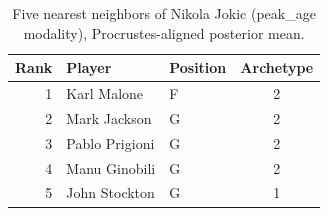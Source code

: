 \begin{table}[htbp]
  \centering\small
  \begin{tabular}{rllc}
    \toprule
    Rank & Player & Position & Archetype \\
    \midrule
    1 & Karl Malone & F & 2 \\
    2 & Mark Jackson & G & 2 \\
    3 & Pablo Prigioni & G & 2 \\
    4 & Manu Ginobili & G & 2 \\
    5 & John Stockton & G & 1 \\
    \bottomrule
  \end{tabular}
  \caption{Five nearest neighbors of Nikola Jokic (peak_age modality), Procrustes-aligned posterior mean.}
  \label{tab:Nikola_Jokic_neighbors_peak_age}
\end{table}


